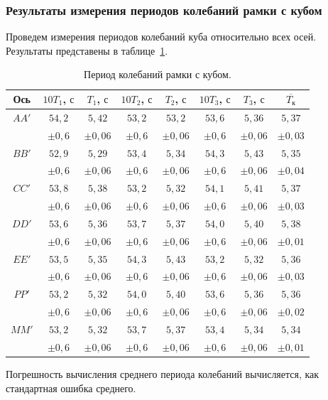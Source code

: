 \documentclass[a4paper,11pt]{article}
\begin{document}
\subsubsection{Результаты измерения периодов колебаний рамки с кубом} %
Проведем измерения периодов колебаний куба относительно всех осей. Результаты представены в таблице~\ref{table:tab3}.
\begin{table}[h!]
\centering
\begin{tabular}{ ||c|c|c|c|c|c|c|c|| }
  \hline
  Ось & $10 T_{1}$, $с$ & $T_{1}$, $с$ & $10 T_{2}$, $с$ & $T_{2}$, $с$ & $10 T_{3}$, $с$ & $T_{3}$, $с$ & $\overline{T_{к}}$ \\
  \hline
  $AA'$ & $54,2$ & $5,42$ & $53,2$ & $53,2$ & $53,6$ & $5,36$ & $5,37$ \\
   & $\pm 0,6$ & $\pm 0,06$ & $\pm 0,6$ & $\pm 0,06$ & $\pm 0,6$ & $\pm 0,06$ & $\pm 0,03$ \\
  $BB'$ & $52,9$ & $5,29$ & $53,4$ & $5,34$ & $54,3$ & $5,43$ & $5,35$ \\
   & $\pm 0,6$ & $\pm 0,06$ & $\pm 0,6$ & $\pm 0,06$ & $\pm 0,6$ & $\pm 0,06$ & $\pm 0,04$ \\
  $CC'$ & $53,8$ & $5,38$ & $53,2$ & $5,32$ & $54,1$ & $5,41$ & $5,37$ \\
   & $\pm 0,6$ & $\pm 0,06$ & $\pm 0,6$ & $\pm 0,06$ & $\pm 0,6$ & $\pm 0,06$ & $\pm 0,03$ \\
  $DD'$ & $53,6$ & $5,36$ & $53,7$ & $5,37$ & $54,0$ & $5,40$ & $5,38$ \\
   & $\pm 0,6$ & $\pm 0,06$ & $\pm 0,6$ & $\pm 0,06$ & $\pm 0,6$ & $\pm 0,06$ & $\pm 0,01$ \\
  $EE'$ & $53,5$ & $5,35$ & $54,3$ & $5,43$ & $53,2$ & $5,32$ & $5,36$ \\
   & $\pm 0,6$ & $\pm 0,06$ & $\pm 0,6$ & $\pm 0,06$ & $\pm 0,6$ & $\pm 0,06$ & $\pm 0,03$ \\
  $PP'$ & $53,2$ & $5,32$ & $54,0$ & $5,40$ & $53,6$ & $5,36$ & $5,36$ \\
   & $\pm 0,6$ & $\pm 0,06$ & $\pm 0,6$ & $\pm 0,06$ & $\pm 0,6$ & $\pm 0,06$ & $\pm 0,02$ \\
  $MM'$ & $53,2$ & $5,32$ & $53,7$ & $5,37$ & $53,4$ & $5,34$ & $5,34$ \\
   & $\pm 0,6$ & $\pm 0,06$ & $\pm 0,6$ & $\pm 0,06$ & $\pm 0,6$ & $\pm 0,06$ & $\pm 0,01$ \\
  \hline
\end{tabular}
\caption{Период колебаний рамки с кубом.}
\label{table:tab3}
\end{table}\newline
Погрешность вычисления среднего периода колебаний вычисляется, как стандартная ошибка среднего.
\end{document}
